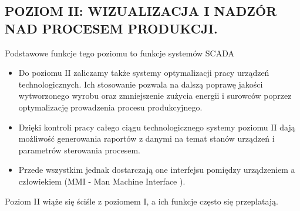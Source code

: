 \documentclass{article}
\begin{document}
    	\subsection{POZIOM II: WIZUALIZACJA I NADZÓR NAD PROCESEM PRODUKCJI.}
    	Podstawowe funkcje tego poziomu to funkcje systemów SCADA
    \begin{itemize}
    	\item Do poziomu II zaliczamy także systemy optymalizacji pracy urządzeń
    	technologicznych. Ich stosowanie pozwala na dalszą poprawę jakości
    	wytworzonego wyrobu oraz zmniejszenie zużycia energii i surowców
    	poprzez optymalizację prowadzenia procesu produkcyjnego.
    	\item Dzięki kontroli pracy całego ciągu technologicznego systemy poziomu II
    	dają możliwość generowania raportów z danymi na temat stanów urządzeń
    	i parametrów sterowania procesem.
    	\item  Przede wszystkim jednak dostarczają one interfejsu pomiędzy urządzeniem
    	a człowiekiem (MMI - Man Machine Interface ).    	
    \end{itemize}
    	Poziom II wiąże się ściśle z poziomem I, a ich funkcje często się przeplatają.
    	
\end{document}
